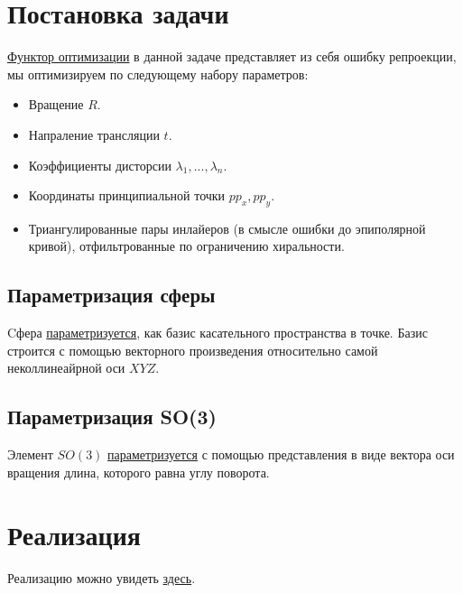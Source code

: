 \label{bundle_adj}
\section{Постановка задачи}
\href{https://github.com/QuantumMechanicus/camera_calibration_test/blob/dev/subroutines/global_non_linear_optimizer/Global_Non_Linear_Estimator.h#L30}{Функтор оптимизации} в данной задаче представляет из себя ошибку репроекции, мы оптимизируем по следующему набору параметров:
\begin{itemize}
	\item Вращение $R$.
	\item Напраление трансляции $t$.
	\item Коэффициенты дисторсии $\lambda_1,...,\lambda_n$.
	\item Координаты принципиальной точки $pp_x, pp_y$.
	\item Триангулированные пары инлайеров (в смысле ошибки до эпиполярной кривой), отфильтрованные по ограничению хиральности.
\end{itemize}	 
\subsection{Параметризация сферы}
Cфера \href{https://github.com/QuantumMechanicus/camera_calibration_test/blob/dev/core/utils/Local_Parametrization_Sphere.h}{параметризуется}, как базис касательного пространства в точке. Базис строится с помощью векторного произведения относительно самой неколлинеайрной оси $XYZ$.
\subsection{Параметризация SO(3)}
Элемент $SO(3)$ \href{https://github.com/QuantumMechanicus/camera_calibration_test/blob/dev/core/utils/Local_Parametrization_SO3.h}{параметризуется} с помощью представления в виде вектора оси вращения длина, которого равна углу поворота.

\section{Реализация}
Реализацию можно увидеть \href{https://github.com/QuantumMechanicus/camera_calibration_test/tree/dev/subroutines/global_non_linear_optimizer}{здесь}.